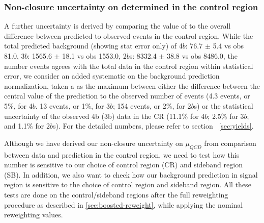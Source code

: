 
\subsubsection{Non-closure uncertainty on \muqcd determined in the control region}
\label{sec:non-closure-mu-qcd}

A further uncertainty is derived by comparing the value of \muqcd to the overall difference between predicted to observed events in the control region. While the total predicted background (showing stat error only) of 4$b$: 76.7 $\pm$ 5.4 vs obs 81.0, 3$b$: 1565.6 $\pm$ 18.1 vs obs 1553.0, 2$b$s: 8332.4 $\pm$ 38.8 vs obs 8486.0, the number events agrees with the total data in the control region within statistical error, we consider an added systematic on the background prediction normalization, taken a as the maximum between either the difference between the central value of the prediction to the observed number of events (4.3 events, or 5\%, for 4$b$.  13 events, or 1\%, for 3$b$; 154 events, or 2\%, for 2$b$s) or the statistical uncertainty of the observed 4b (3b) data in the CR (11.1\% for $4b$; 2.5\% for $3b$; and 1.1\% for 2$b$s). For the detailed numbers, please refer to section ~\ref{sec:yields}. 

Although we have derived our non-closure uncertainty on $\mu_{QCD}$ from comparison between data and prediction in the control region, we need to test how this number is sensitive to our choice of control region (CR) and sideband region (SB). In addition, we also want to check how our background prediction in signal region is sensitive to the choice of control region and sideband region. All these tests are done on the control/sideband regions after the full reweighting procedure as described in \ref{sec:boosted-reweight}, while applying the nominal reweighting values.

